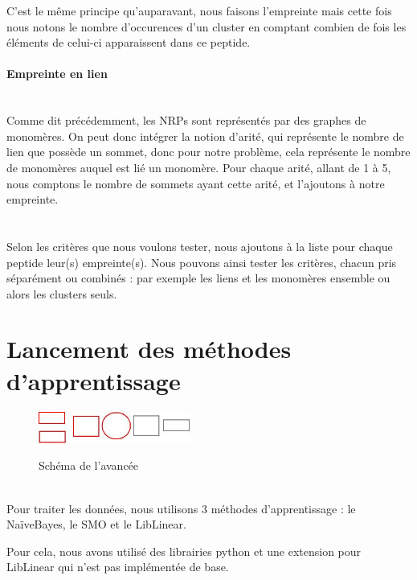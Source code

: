 \documentclass[a4paper,10pt]{report}
\begin{document}
	  C'est le même principe qu'auparavant, nous faisons l'empreinte mais cette fois nous notons le nombre d'occurences d'un cluster en comptant combien de fois les éléments de celui-ci apparaissent dans ce peptide.
	 
	  
	\paragraph{Empreinte en lien}
	    ~\\
	    Comme dit précédemment, les NRPs sont représentés par des graphes de monomères. On peut donc intégrer la notion d'arité, qui représente le nombre de lien que possède un sommet, donc pour notre problème, cela représente le nombre de monomères auquel est lié un monomère. 
	    Pour chaque arité, allant de 1 à 5, nous comptons le nombre de sommets ayant cette arité, et l'ajoutons à notre empreinte.

	\paragraph{}
	  ~\\
	  Selon les critères que nous voulons tester, nous ajoutons à la liste pour chaque peptide leur(s) empreinte(s).
	  Nous pouvons ainsi tester les critères, chacun pris séparément ou combinés : par exemple les liens et les monomères ensemble ou alors les clusters seuls.
	  
     \section{Lancement des méthodes d'apprentissage}
     
	  \begin{figure}[!h]
	    \begin{center}
	      \includegraphics[width=5cm]{image/step3.jpeg} \\
	      \caption{Schéma de l'avancée}
	    \end{center}
	 \end{figure}
	  
	  ~\\
	  Pour traiter les données, nous utilisons 3 méthodes d'apprentissage : le NaïveBayes, le SMO et le LibLinear. 
	  
	  Pour cela, nous avons utilisé des librairies python et une extension pour LibLinear qui n'est pas implémentée de base.
	  
\end{document}
